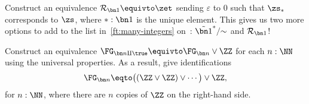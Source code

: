 \begin{xca}
  Construct an equivalence $\mathcal R_{\bn 1} \equivto \zet$
  sending $\varepsilon$ to $0$ such that $\zs_*$ corresponds to $\zs$,
  where $*:\bn 1$ is the unique element.
  This gives us two more options to add to the list in~\cref{ft:many-integers}
  on~: $\tilde{\bn 1}^*/{\sim}$ and $\mathcal R_{\bn 1}$!
\end{xca}

\begin{xca}
  Construct an equivalence $\FG_{\bn n \amalg \true} \equivto \FG_{\bn n}
  \vee \ZZ$ for each $n : \NN$ using the universal properties.
  As a result, give identifications
  \[
    \FG_{\bn n} \eqto \bigl((\ZZ \vee \ZZ) \vee \cdots\bigr) \vee \ZZ,
  \]
  for $n:\NN$, where there are $n$ copies of $\ZZ$ on the right-hand side.
\end{xca}

